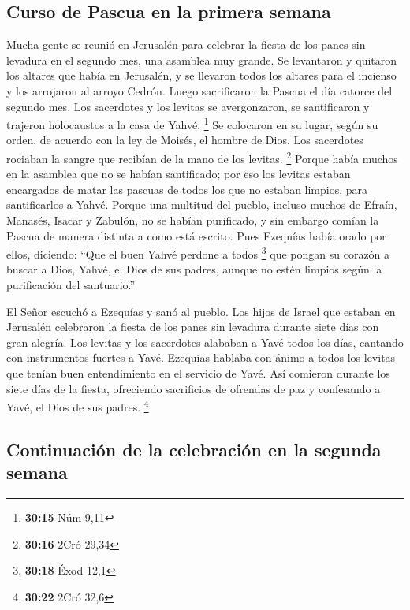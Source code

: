 \begin{paracol}{2}
\hypertarget{curso-de-pascua-en-la-primera-semana}{%
\subsection{Curso de Pascua en la primera
semana}\label{curso-de-pascua-en-la-primera-semana}}

 Mucha gente se reunió en Jerusalén para celebrar la
fiesta de los panes sin levadura en el segundo mes, una asamblea muy
grande.  Se levantaron y quitaron los altares que había
en Jerusalén, y se llevaron todos los altares para el incienso y los
arrojaron al arroyo Cedrón.  Luego sacrificaron la Pascua
el día catorce del segundo mes. Los sacerdotes y los levitas se
avergonzaron, se santificaron y trajeron holocaustos a la casa de Yahvé.
\footnote{\textbf{30:15} Núm 9,11}  Se colocaron en su
lugar, según su orden, de acuerdo con la ley de Moisés, el hombre de
Dios. Los sacerdotes rociaban la sangre que recibían de la mano de los
levitas. \footnote{\textbf{30:16} 2Cró 29,34}  Porque
había muchos en la asamblea que no se habían santificado; por eso los
levitas estaban encargados de matar las pascuas de todos los que no
estaban limpios, para santificarlos a Yahvé.  Porque una
multitud del pueblo, incluso muchos de Efraín, Manasés, Isacar y
Zabulón, no se habían purificado, y sin embargo comían la Pascua de
manera distinta a como está escrito. Pues Ezequías había orado por
ellos, diciendo: ``Que el buen Yahvé perdone a todos \footnote{\textbf{30:18}
  Éxod 12,1}  que pongan su corazón a buscar a Dios,
Yahvé, el Dios de sus padres, aunque no estén limpios según la
purificación del santuario.''

 El Señor escuchó a Ezequías y sanó al pueblo.
 Los hijos de Israel que estaban en Jerusalén celebraron
la fiesta de los panes sin levadura durante siete días con gran alegría.
Los levitas y los sacerdotes alababan a Yavé todos los días, cantando
con instrumentos fuertes a Yavé.  Ezequías hablaba con
ánimo a todos los levitas que tenían buen entendimiento en el servicio
de Yavé. Así comieron durante los siete días de la fiesta, ofreciendo
sacrificios de ofrendas de paz y confesando a Yavé, el Dios de sus
padres. \footnote{\textbf{30:22} 2Cró 32,6}

\hypertarget{continuaciuxf3n-de-la-celebraciuxf3n-en-la-segunda-semana}{%
\subsection{Continuación de la celebración en la segunda
semana}\label{continuaciuxf3n-de-la-celebraciuxf3n-en-la-segunda-semana}}


\end{paracol}
